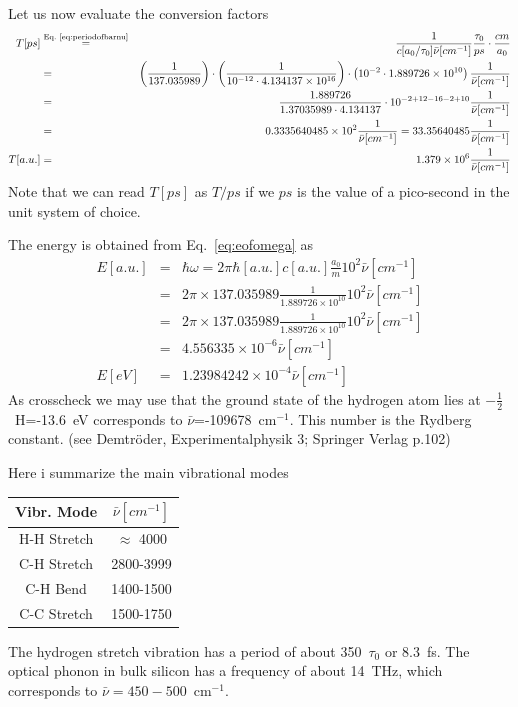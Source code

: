 \documentclass[final,12pt]{article}
\begin{document}
{{{{{{Let us now evaluate the conversion factors
\begin{eqnarray*}
T[ps]&\stackrel{\textrm{Eq.~\ref{eq:periodofbarnu}}}{=}& \frac{1}{c[a_0/\tau_0]\bar{\nu}[cm^{-1}] } 
\frac{\tau_0}{ps}\cdot\frac{cm}{a_0}
\\
&=&
\left(\frac{1}{137.035989}\right)\cdot
\left(\frac{1}{10^{-12}\cdot 4.134137\times 10^{16}}\right)
\cdot\left(10^{-2}\cdot 1.889726\times 10^{10}\right)
\frac{1}{\bar{\nu}[cm^{-1}] } 
\\
&=&
\frac{1.889726}{1.37035989\cdot4.134137}\cdot10^{-2+12-16-2+10}
\frac{1}{\bar{\nu}[cm^{-1}] } 
\\
&=&0.3335640485\times10^{2}
\frac{1}{\bar{\nu}[cm^{-1}] } 
=33.35640485\frac{1}{\bar{\nu}[cm^{-1}] }
\\
T[a.u.]&=&1.379\times 10^6 \frac{1}{\bar{\nu}[cm^{-1}] }
\end{eqnarray*}
Note that we can read $T[ps]$ as $T/ps$ if we $ps$ is the value of a
pico-second in the unit system of choice.

The energy is obtained from Eq.~\ref{eq:eofomega} as
\begin{eqnarray*}
E[a.u.]&=&\hbar\omega=2\pi\hbar[a.u.] c[a.u.]\frac{a_0}{m}
10^2
\bar{\nu}[cm^{-1}]
\\
&=&2\pi\times 137.035989\frac{1}{1.889726\times 10^{10}}10^2\bar{\nu}[cm^{-1}]
\\
&=&2\pi\times 137.035989\frac{1}{1.889726\times 10^{10}}10^2\bar{\nu}[cm^{-1}]
\\
&=&4.556335\times10^{-6}\bar{\nu}[cm^{-1}]
\\
E[eV]&=&1.23984242\times10^{-4}\bar{\nu}[cm^{-1}]
\end{eqnarray*}
As crosscheck we may use that the ground state of the hydrogen atom lies at
$-\frac{1}{2}$~H=-13.6~eV corresponds to $\bar{\nu}$=-109678~cm$^{-1}$. This
number is the Rydberg constant. (see Demtr\"oder, Experimentalphysik 3;
Springer Verlag p.102)

Here i summarize the main vibrational modes
\begin{center}
\begin{tabular}{|c|c|}
\hline
Vibr. Mode & $\bar{\nu}[cm^{-1}]$\\ 
\hline
H-H Stretch & $\approx$ 4000\\
C-H Stretch & 2800-3999 \\
C-H Bend    & 1400-1500 \\
C-C Stretch & 1500-1750 \\
\hline
\end{tabular}
\end{center}
The hydrogen stretch vibration has a period of about 350~$\tau_0$ or 8.3~fs.
The optical phonon in bulk silicon has a frequency of about 14~THz, which
corresponds to $\bar{\nu}=450-500$~cm$^{-1}$.

}}}}}}
\end{document}
